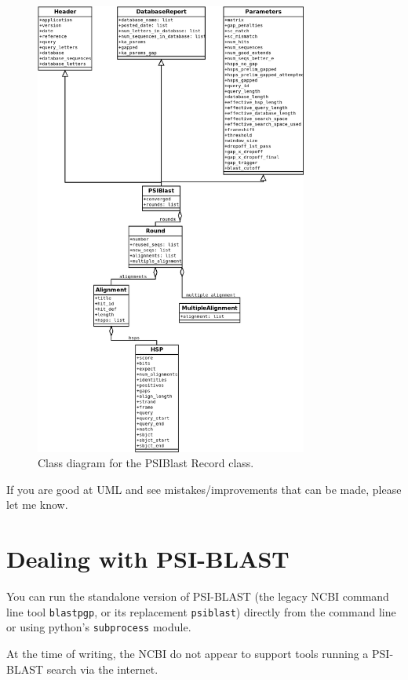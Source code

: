 \begin{figure}[htbp]
\centering
\includegraphics[width=0.8\textwidth]{images/PSIBlastRecord.png}
\caption{Class diagram for the PSIBlast Record class.}
\label{fig:psiblastrecord}
\end{figure}

If you are good at UML and see mistakes/improvements that can be made, please let me know.

\section{Dealing with PSI-BLAST}

You can run the standalone version of PSI-BLAST (the legacy NCBI command line
tool \verb|blastpgp|, or its replacement \verb|psiblast|) directly from the
command line or using python's \verb|subprocess| module.

At the time of writing, the NCBI do not appear to support tools running a
PSI-BLAST search via the internet.

